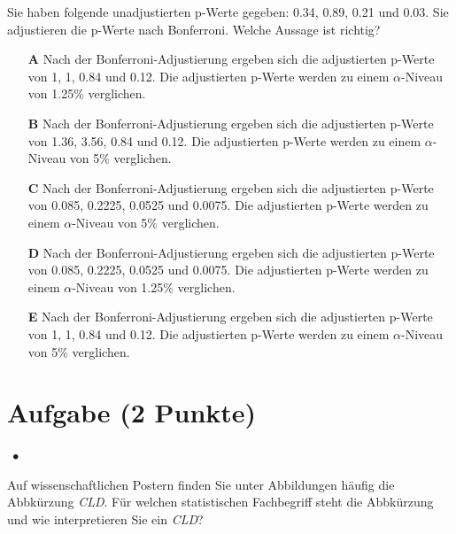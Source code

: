 \documentclass[a4paper, 9pt]{scrartcl}\usepackage[]{graphicx}\usepackage[]{xcolor}
\begin{document}
Sie haben folgende unadjustierten p-Werte gegeben: 0.34, 0.89, 0.21 und 0.03. Sie adjustieren die p-Werte nach
Bonferroni. Welche Aussage ist richtig?



\begin{enumerate}
\item [\textbf{A} \msquare] Nach der Bonferroni-Adjustierung ergeben sich die adjustierten p-Werte von 1, 1, 0.84 und 0.12. Die adjustierten p-Werte werden zu einem $\alpha$-Niveau von 1.25\% verglichen.
\item [\textbf{B} \msquare] Nach der Bonferroni-Adjustierung ergeben sich die adjustierten p-Werte von 1.36, 3.56, 0.84 und 0.12. Die adjustierten p-Werte werden zu einem $\alpha$-Niveau von 5\% verglichen.
\item [\textbf{C} \msquare] Nach der Bonferroni-Adjustierung ergeben sich die adjustierten p-Werte von 0.085, 0.2225, 0.0525 und 0.0075. Die adjustierten p-Werte werden zu einem $\alpha$-Niveau von 5\% verglichen.
\item [\textbf{D} \msquare] Nach der Bonferroni-Adjustierung ergeben sich die adjustierten p-Werte von 0.085, 0.2225, 0.0525 und 0.0075. Die adjustierten p-Werte werden zu einem $\alpha$-Niveau von 1.25\% verglichen.
\item [\textbf{E} \msquare] Nach der Bonferroni-Adjustierung ergeben sich die adjustierten p-Werte von 1, 1, 0.84 und 0.12. Die adjustierten p-Werte werden zu einem $\alpha$-Niveau von 5\% verglichen.
\end{enumerate}

\section{Aufgabe \hfill (2 Punkte)}

\ifcollection
\begin{flushright}
\tiny\vspace{-2Ex}
\textbf{\examinhaltstart}
\exammodulestatversuch $\;\bullet$
\exammodulebiostat
\vspace{-1Ex}
\end{flushright}
\fi




Auf wissenschaftlichen Postern finden Sie unter Abbildungen häufig die Abbkürzung \textit{CLD}. Für welchen statistischen Fachbegriff steht die Abbkürzung und wie interpretieren Sie ein \textit{CLD}?
\end{document}
